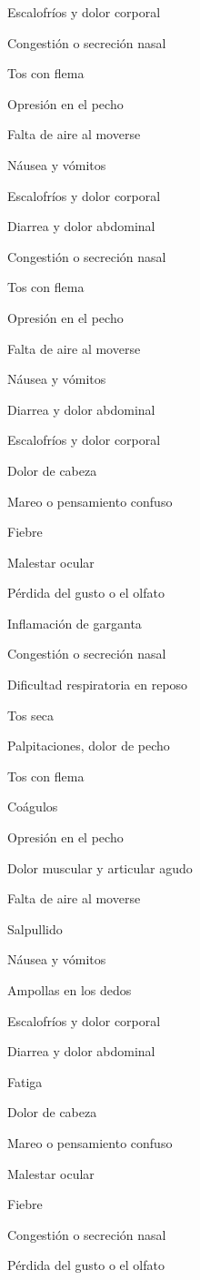Escalofríos y dolor corporal

Congestión o secreción nasal

Tos con flema

Opresión en el pecho

Falta de aire al moverse

Náusea y vómitos

Escalofríos y dolor corporal

Diarrea y dolor abdominal

Congestión o secreción nasal

Tos con flema

Opresión en el pecho

Falta de aire al moverse

Náusea y vómitos

Diarrea y dolor abdominal

Escalofríos y dolor corporal

Dolor de cabeza

Mareo o pensamiento confuso

Fiebre

Malestar ocular

Pérdida del gusto o el olfato

Inflamación de garganta

Congestión o secreción nasal

Dificultad respiratoria en reposo

Tos seca

Palpitaciones, dolor de pecho

Tos con flema

Coágulos

Opresión en el pecho

Dolor muscular y articular agudo

Falta de aire al moverse

Salpullido

Náusea y vómitos

Ampollas en los dedos

Escalofríos y dolor corporal

Diarrea y dolor abdominal

Fatiga

Dolor de cabeza

Mareo o pensamiento confuso

Malestar ocular

Fiebre

Congestión o secreción nasal

Pérdida del gusto o el olfato

